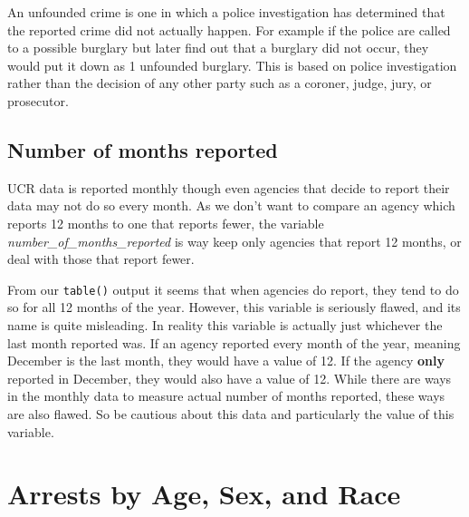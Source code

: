 \documentclass[
  12pt,
  openany]{book}
\begin{document}
An unfounded crime is one in which a police investigation has determined that the reported crime did not actually happen. For example if the police are called to a possible burglary but later find out that a burglary did not occur, they would put it down as 1 unfounded burglary. This is based on police investigation rather than the decision of any other party such as a coroner, judge, jury, or prosecutor.

\hypertarget{number-of-months-reported}{%
\section{Number of months reported}\label{number-of-months-reported}}

UCR data is reported monthly though even agencies that decide to report their data may not do so every month. As we don't want to compare an agency which reports 12 months to one that reports fewer, the variable \emph{number\_of\_months\_reported} is way keep only agencies that report 12 months, or deal with those that report fewer.

From our \texttt{table()} output it seems that when agencies do report, they tend to do so for all 12 months of the year. However, this variable is seriously flawed, and its name is quite misleading. In reality this variable is actually just whichever the last month reported was. If an agency reported every month of the year, meaning December is the last month, they would have a value of 12. If the agency \textbf{only} reported in December, they would also have a value of 12. While there are ways in the monthly data to measure actual number of months reported, these ways are also flawed. So be cautious about this data and particularly the value of this variable.

\hypertarget{arrests}{%
\chapter{Arrests by Age, Sex, and Race}\label{arrests}}
\end{document}
